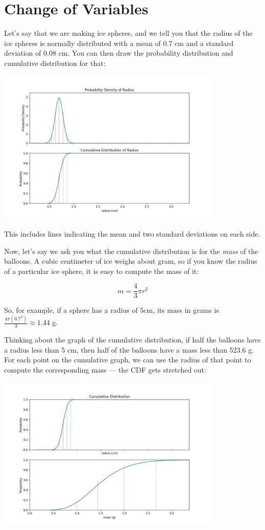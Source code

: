 \chapter{Change of Variables}

Let's say that we are making ice spheres, and we tell you that the radius of the ice spheres is normally distributed with a mean
of 0.7 cm and a standard deviation of 0.08 cm. You can then draw the probability distribution and cumulative distribution for that:

\includegraphics[width=0.8\textwidth]{before.png}

This includes lines indicating the mean and two standard deviations on each side.

Now,  let's say we ask you what the cumulative distribution is for the \emph{mass} of the balloons.   A cubic centimeter of ice weighs about gram, so if you know
the radius of a particular ice sphere,  it is easy to compute the mass of it:

$$m = \frac{4}{3} \pi r^3$$

So, for example,  if a sphere has a radius of 5cm,  its mass in grams is  $\frac{4 \pi (0.7^3)}{3}  \approx 1.44$ g.

Thinking about the graph of the cumulative distribution, if half the balloons have a radius less than 5 cm,  then half of the balloons have a mass less than 523.6 g. For each point on the cumulative graph,  we can use the radius of that point to compute the corresponding mass --- the CDF gets stretched out:

\includegraphics[width=0.8\textwidth]{cdf_after.png}

